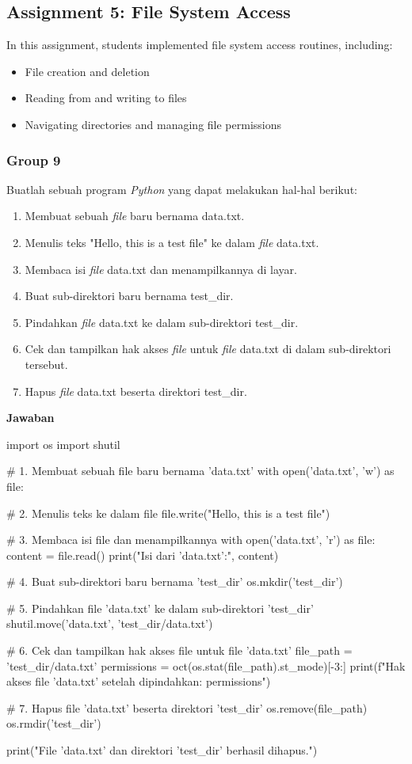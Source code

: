 \documentclass[12pt]{article}
\begin{document}
\subsection{Assignment 5: File System Access}
In this assignment, students implemented file system access routines, including:
\begin{itemize}
    \item File creation and deletion
    \item Reading from and writing to files
    \item Navigating directories and managing file permissions
\end{itemize}

\subsubsection{Group 9}
Buatlah sebuah program \textit{Python} yang dapat melakukan hal-hal berikut:
\begin{enumerate}
    \item Membuat sebuah \textit{file} baru bernama data.txt.
    \item Menulis teks "Hello, this is a test file" ke dalam \textit{file} data.txt.
    \item Membaca isi \textit{file} data.txt dan menampilkannya di layar.
    \item Buat sub-direktori baru bernama test_dir.
    \item Pindahkan \textit{file} data.txt ke dalam sub-direktori test_dir.
    \item Cek dan tampilkan hak akses \textit{file} untuk \textit{file} data.txt di dalam sub-direktori tersebut.
    \item Hapus \textit{file} data.txt beserta direktori test_dir.
\end{enumerate}

\textbf{Jawaban}
\begin{python}
import os
import shutil

# 1. Membuat sebuah file baru bernama 'data.txt'
with open('data.txt', 'w') as file:

# 2. Menulis teks ke dalam file
file.write("Hello, this is a test file")

# 3. Membaca isi file dan menampilkannya
with open('data.txt', 'r') as file:
content = file.read()
print("Isi dari 'data.txt':", content)

# 4. Buat sub-direktori baru bernama 'test_dir'
os.mkdir('test_dir')

# 5. Pindahkan file 'data.txt' ke dalam sub-direktori 'test_dir'
shutil.move('data.txt', 'test_dir/data.txt')

# 6. Cek dan tampilkan hak akses file untuk file 'data.txt'
file_path = 'test_dir/data.txt'
permissions = oct(os.stat(file_path).st_mode)[-3:]
print(f"Hak akses file 'data.txt' setelah dipindahkan: {permissions}")

# 7. Hapus file 'data.txt' beserta direktori 'test_dir'
os.remove(file_path)
os.rmdir('test_dir')

print("File 'data.txt' dan direktori 'test_dir' berhasil dihapus.")

\end{python}
\end{document}
